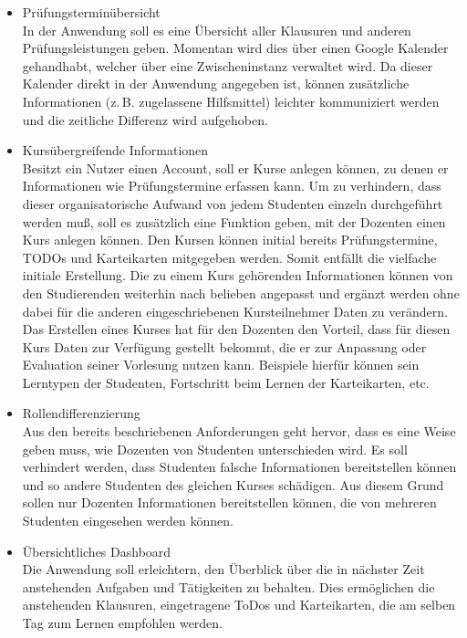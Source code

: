 \begin{itemize}
    \item Prüfungsterminübersicht           \\
        In der Anwendung soll es eine Übersicht aller Klausuren und anderen Prüfungsleistungen geben.
        Momentan wird dies über einen Google Kalender gehandhabt, welcher über eine Zwischeninstanz verwaltet wird.
        Da dieser Kalender direkt in der Anwendung angegeben ist, können zusätzliche Informationen (z.\,B. zugelassene Hilfsmittel) leichter kommuniziert werden und die zeitliche Differenz wird aufgehoben.

    \item Kursübergreifende Informationen   \\
        Besitzt ein Nutzer einen Account, soll er Kurse anlegen können, zu denen er Informationen wie  Prüfungstermine erfassen kann.
        Um zu verhindern, dass dieser organisatorische Aufwand von jedem Studenten einzeln durchgeführt werden muß, soll es zusätzlich eine Funktion geben, mit der Dozenten einen Kurs anlegen können.
        Den Kursen können initial bereits Prüfungstermine, TODOs und Karteikarten mitgegeben werden.
        Somit entfällt die vielfache initiale Erstellung.
        Die zu einem Kurs gehörenden Informationen können von den Studierenden weiterhin nach belieben angepasst und ergänzt werden ohne dabei für die anderen eingeschriebenen Kursteilnehmer Daten zu verändern.
        Das Erstellen eines Kurses hat für den Dozenten den Vorteil, dass für diesen Kurs Daten zur Verfügung gestellt bekommt, die er zur Anpassung oder Evaluation seiner Vorlesung nutzen kann.
        Beispiele hierfür können sein Lerntypen der Studenten, Fortschritt beim Lernen der Karteikarten, etc.
    \item Rollendifferenzierung             \\
        Aus den bereits beschriebenen Anforderungen geht hervor, dass es eine Weise geben muss, wie Dozenten von Studenten unterschieden wird.
        Es soll verhindert werden, dass Studenten falsche Informationen bereitstellen können und so andere Studenten des gleichen Kurses schädigen.
        Aus diesem Grund sollen nur Dozenten Informationen bereitstellen können, die von mehreren Studenten eingesehen werden können.
    \item Übersichtliches Dashboard			\\
   		Die Anwendung soll erleichtern, den Überblick über die in nächster Zeit anstehenden Aufgaben und Tätigkeiten zu behalten. Dies ermöglichen die anstehenden Klausuren, eingetragene ToDos und Karteikarten, die am selben Tag zum Lernen empfohlen werden.

\end{itemize}
